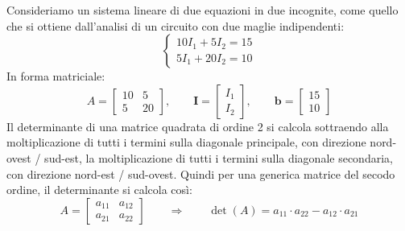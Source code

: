 Consideriamo un sistema lineare di due equazioni in due incognite, come quello che si ottiene dall'analisi di un circuito con due maglie indipendenti:
\begin{equation}
\begin{cases}
10 I_1 + 5 I_2 = 15 \\
5 I_1 + 20 I_2 = 10
\end{cases}
\label{eq:sistema_2x2_esempio}
\end{equation}
In forma matriciale:
\begin{equation}
A = \begin{bmatrix}
10 & 5 \\
5  & 20
\end{bmatrix},\qquad
\mathbf{I} = \begin{bmatrix}
I_1 \\ I_2
\end{bmatrix},\qquad
\mathbf{b} = \begin{bmatrix}
15 \\ 10
\end{bmatrix}
\label{eq:matrice_2x2_esempio}
\end{equation}
Il determinante di una matrice quadrata di ordine 2 si calcola sottraendo alla moltiplicazione di tutti i termini sulla diagonale principale, con direzione nord-ovest / sud-est, la moltiplicazione di tutti i termini sulla diagonale secondaria, con direzione nord-est / sud-ovest.
Quindi per una generica matrice del secodo ordine, il determinante si calcola così:
\begin{equation}
A = \begin{bmatrix}
a_{11} & a_{12} \\
a_{21}  & a_{22}
\end{bmatrix}\qquad
\Rightarrow \qquad
\det (A) = a_{11} \cdot a_{22} - a_{12} \cdot a_{21}
\end{equation}

